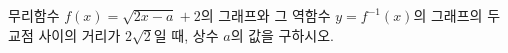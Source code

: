 무리함수 $f(x)=\sqrt{2x-a}+2$의 그래프와 그 역함수 $y=f^{-1}(x)$의 그래프의 두 교점 사이의 거리가 $2\sqrt{2}$일 때, 상수 $a$의 값을 구하시오.
